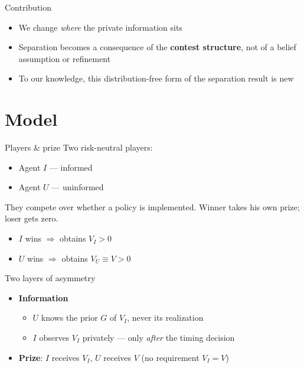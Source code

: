\documentclass[10pt]{beamer}
\begin{document}
\begin{frame}{Contribution}
  \begin{itemize}
    \item We change \emph{where} the private information sits
    \item Separation becomes a consequence of the \textbf{contest
          structure}, not of a belief assumption or refinement
    \item To our knowledge, this distribution-free form of the
          separation result is new
  \end{itemize}
\end{frame}

\section{Model}

\begin{frame}{Players \& prize}
  Two risk-neutral players:
  \begin{itemize}
    \item Agent $I$ --- informed
    \item Agent $U$ --- uninformed
  \end{itemize}

  They compete over whether a policy is implemented. Winner takes his
  own prize; loser gets zero.
  \begin{itemize}
    \item $I$ wins $\Rightarrow$ obtains $V_I > 0$
    \item $U$ wins $\Rightarrow$ obtains $V_U \equiv V > 0$
  \end{itemize}
\end{frame}

\begin{frame}{Two layers of asymmetry}
  \begin{itemize}
    \item \textbf{Information}
      \begin{itemize}\normalsize
        \item $U$ knows the prior $G$ of $V_I$, never its realization
        \item $I$ observes $V_I$ privately --- only \emph{after} the
              timing decision
      \end{itemize}
    \item \textbf{Prize}: $I$ receives $V_I$, $U$ receives $V$
          (no requirement $V_I = V$)
  \end{itemize}
\end{frame}
\end{document}
